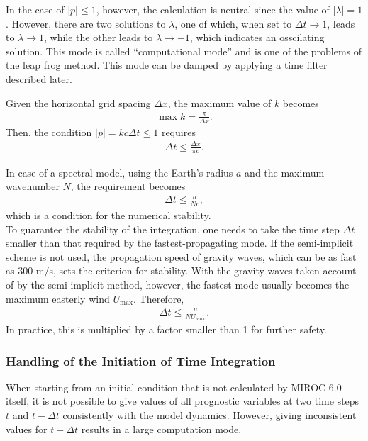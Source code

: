 In the case of \(|p| \le 1\), however, the calculation is neutral since
the value of \(|\lambda| = 1\). However, there are two solutions to
\(\lambda\), one of which, when set to \(\Delta t \rightarrow 1\), leads
to \(\lambda \rightarrow 1\), while the other leads to
\(\lambda \rightarrow -1\), which indicates an osscilating solution.
This mode is called ``computational mode'' and is one of the problems of
the leap frog method. This mode can be damped by applying a time filter
described later.

Given the horizontal grid spacing \(\Delta x\), the maximum value of
\(k\) becomes
\begin{eqnarray}
  \max k = \frac{\pi}{\Delta x}.
\end{eqnarray}
Then, the condition \(|p|=kc \Delta t \le 1\) requires
\begin{eqnarray}
   \Delta t \le \frac{\Delta x}{\pi c}.
\end{eqnarray}

In case of a spectral model, using the Earth's radius \(a\) and the
maximum wavenumber \(N\), the requirement becomes
\begin{eqnarray}
   \Delta t \le \frac{a}{N c},
\end{eqnarray}
which is a condition for the numerical stability.\\

To guarantee the stability of the integration, one needs to take the time step  \(\Delta t\) smaller than that required by the fastest-propagating mode.
If the semi-implicit scheme is not used, the propagation speed of gravity waves, which can be as fast as 300 m$/$s, sets the criterion for stability.
With the gravity waves taken account of by the semi-implicit method, however, the fastest mode usually becomes the maximum easterly wind $U_{\mathrm{max}}$. Therefore,
\begin{eqnarray}
   \Delta t \le \frac{a}{N U_{max}} .
\end{eqnarray}
In practice, this is multiplied by a factor smaller than 1 for further safety.

\hypertarget{handling-of-the-initiation-of-time-integration}{%
\subsubsection{Handling of the Initiation of Time
Integration}\label{handling-of-the-initiation-of-time-integration}}

When starting from an initial condition that is not calculated by
MIROC 6.0 itself, it is not possible to give values of all prognostic variables at two time steps \(t\)
and \(t-\Delta t\) consistently with the model dynamics.
However, giving inconsistent values for \(t-\Delta t\) results in a large computation mode.

